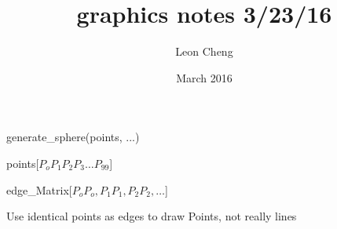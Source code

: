 \documentclass{article}
\title{graphics notes 3/23/16}
\author{Leon Cheng}
\date{March 2016}
\begin{document}
\maketitle


generate\_sphere(points, ...)

points[$P_o P_1 P_2 P_3 \dots P_{99}$]

edge\_Matrix[$P_o P_o, P_1 P_1, P_2 P_2, \dots$]

Use identical points as edges to draw Points, not really lines
\end{document}
